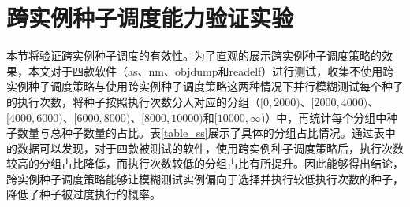 \documentclass[master]{thesis-uestc}
\begin{document}
\section{跨实例种子调度能力验证实验}
本节将验证跨实例种子调度的有效性。为了直观的展示跨实例种子调度策略的效果，本文对于四款软件（as、nm、objdump和readelf）进行测试，收集不使用跨实例种子调度策略与使用跨实例种子调度策略这两种情况下并行模糊测试每个种子的执行次数，将种子按照执行次数分入对应的分组（$[0, 2000)$、$[2000, 4000)$、$[4000, 6000)$、$[6000, 8000)$、$[8000, 10000)$和$[10000, \infty)$）中，再统计每个分组中种子数量与总种子数量的占比。表\ref{table_ss}展示了具体的分组占比情况。通过表中的数据可以发现，对于四款被测试的软件，使用跨实例种子调度策略后，执行次数较高的分组占比降低，而执行次数较低的分组占比有所提升。因此能够得出结论，跨实例种子调度策略能够让模糊测试实例偏向于选择并执行较低执行次数的种子，降低了种子被过度执行的概率。
\end{document}

